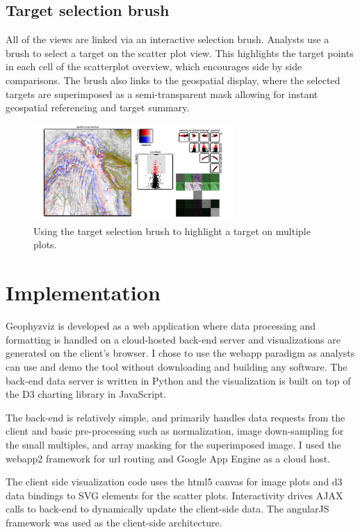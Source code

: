 \documentclass[journal]{vgtc}                %
\begin{document}
\subsection{Target selection brush}
All of the views are linked via an interactive selection brush. Analysts use a brush to
select a target on the scatter plot view. This highlights the target points in each cell of the 
scatterplot overview, which encourages side by side comparisons. The brush also links to the geospatial display,
where the selected targets are superimposed as a semi-transparent mask allowing for instant
geospatial referencing and target summary. 

\begin{figure}[htb]
\centering
\includegraphics[width=3in]{full_view}
\caption{Using the target selection brush to highlight a target on multiple plots.}
\end{figure}

\section{Implementation}
Geophyzviz is developed as a web application where data processing and formatting
is handled on a cloud-hosted back-end server and visualizations are generated
on the client's browser. I chose to use the webapp paradigm as analysts can use and demo the tool without downloading
and building any software. The back-end data server is written in Python and the visualization
is built on top of the D3 charting library in JavaScript.

The back-end is relatively simple, and primarily handles data requests from the client and
basic pre-processing such as normalization, image down-sampling for the small multiples, and array masking
for the superimposed image. I used the webapp2 framework for url routing and Google App Engine as 
a cloud host.

The client side visualization code uses the html5 canvas for image plots and 
d3 data bindings to SVG elements for the scatter plots.  Interactivity
drives AJAX calls to back-end to dynamically update the client-side data. The angularJS framework was used as the
client-side architecture.
\end{document}
